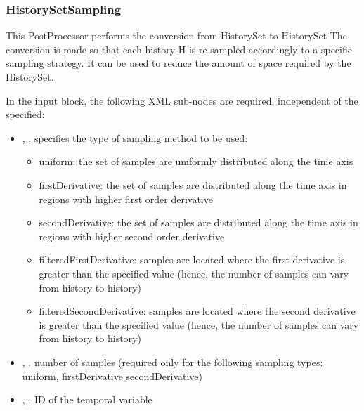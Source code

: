 \subsubsection{HistorySetSampling}
\label{HistorySetSampling}

This PostProcessor performs the conversion from HistorySet to HistorySet
The conversion is made so that each history H is re-sampled accordingly  to a
specific sampling strategy.
It can be used to reduce the amount of space required by the HistorySet.


In the  input block, the following XML sub-nodes are required,
independent of the  specified:

\begin{itemize}
   \item {}, , specifies the type of sampling method to be used:
   \begin{itemize}
     \item uniform: the set of  samples are uniformly distributed along the time axis
     \item firstDerivative: the set of  samples are distributed along the time axis in regions with
                            higher first order derivative
     \item secondDerivative: the set of  samples are distributed along the time axis in regions with
                             higher second order derivative
     \item filteredFirstDerivative: samples are located where the first derivative is greater than the specified  value
                                    (hence, the number of samples can vary from history to history)
     \item filteredSecondDerivative: samples are located where the second derivative is greater than the specified  value
                                     (hence, the number of samples can vary from history to history)
   \end{itemize}
   \item {}, , number of samples (required only for the following sampling
                                             types: uniform, firstDerivative secondDerivative)
   \item {}, , ID of the temporal variable

\end{itemize}
